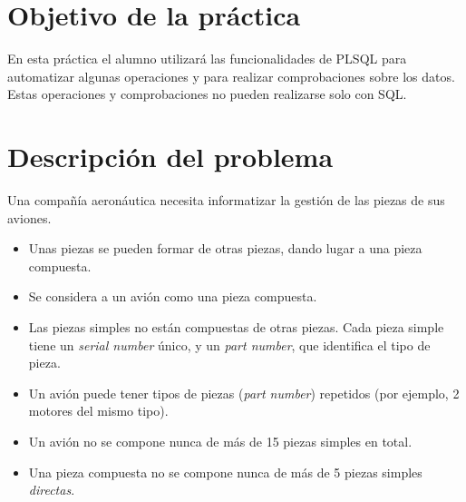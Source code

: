 
\usepackage{eurosym}
\usepackage{needspace}




\renewcommand{\hmwkTitle}{Práctica PLSQL}
\renewcommand{\hmwkClass}{Bases de datos}

\usepackage{blindtext}






\primerapagina

\setlength{\parindent}{1em}
\setlength{\parskip}{1em}

\section{Objetivo de la práctica}
En esta práctica el alumno utilizará las funcionalidades de PLSQL para automatizar algunas operaciones y para realizar comprobaciones sobre los datos. Estas operaciones y comprobaciones no pueden realizarse solo con SQL.


\newcommand{\maximopiezasavion}{15}
\newcommand{\maximopiezaspieza}{5}


\section{Descripción del problema}
Una compañía aeronáutica necesita informatizar la gestión de las piezas de sus aviones.
\begin{itemize}
\item Unas piezas se pueden formar de otras piezas, dando lugar a una pieza compuesta.
\item Se considera a un avión como una pieza compuesta.
\item Las piezas simples no están compuestas de otras piezas. Cada pieza simple tiene un \textit{serial number} único, y un \textit{part number}, que identifica el tipo de pieza.
\item Un avión puede tener tipos de piezas (\textit{part number}) repetidos (por ejemplo, 2 motores del mismo tipo).
\item Un avión no se compone nunca de más de {\maximopiezasavion} piezas simples en total.
\item Una pieza compuesta no se compone nunca de más de {\maximopiezaspieza} piezas simples \textit{directas}.
\end{itemize}


